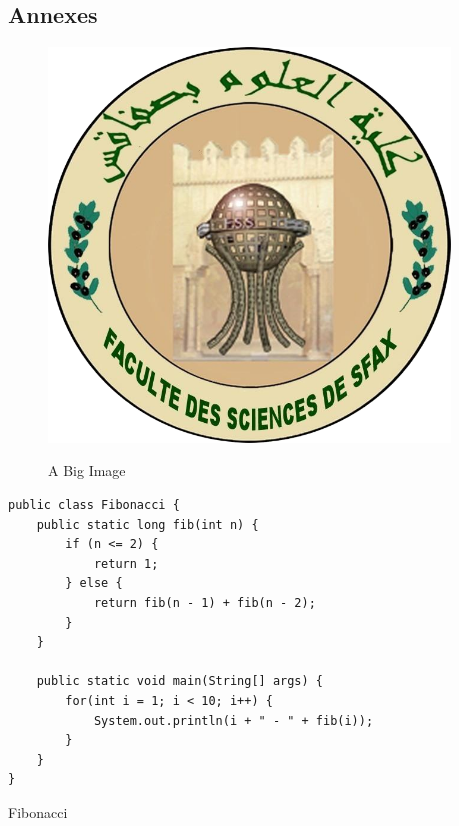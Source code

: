 \begin{appendices}
\section{Annexes}
\pagebreak

\begin{figure}[H]
    \centering
    \caption{A Big Image}
    \includegraphics[width=0.95\textwidth]{fss-old}
    \label{fig:appendixImage}
\end{figure}

\begin{listing}[ht]
    \begin{verbatim}
public class Fibonacci {
	public static long fib(int n) {
		if (n <= 2) {
			return 1;
		} else {
			return fib(n - 1) + fib(n - 2);
		}
	}

	public static void main(String[] args) {
		for(int i = 1; i < 10; i++) {
			System.out.println(i + " - " + fib(i));
		}
	}
}
    \end{verbatim}
    \caption{Fibonacci}
    \label{lst:fibAppendix}
\end{listing}

\end{appendices}
